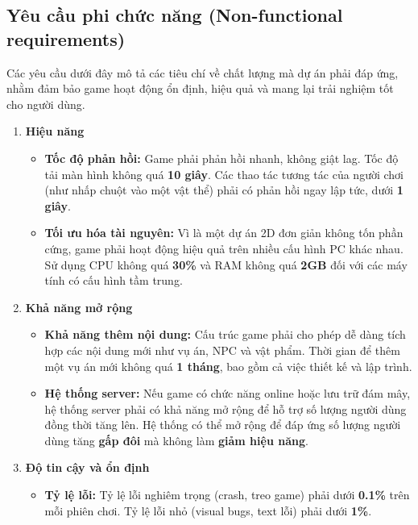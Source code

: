 \subsection{Yêu cầu phi chức năng (Non-functional requirements)}
Các yêu cầu dưới đây mô tả các tiêu chí về chất lượng mà dự án phải đáp ứng, nhằm đảm bảo game hoạt động ổn định, hiệu quả và mang lại trải nghiệm tốt cho người dùng.

\begin{enumerate}
    \item \textbf{Hiệu năng}
    \begin{itemize}
        \item \textbf{Tốc độ phản hồi:} 
        Game phải phản hồi nhanh, không giật lag. Tốc độ tải màn hình không quá \textbf{10 giây}. Các thao tác tương tác của người chơi (như nhấp chuột vào một vật thể) phải có phản hồi ngay lập tức, dưới \textbf{1 giây}.

        \item \textbf{Tối ưu hóa tài nguyên:}
        Vì là một dự án 2D đơn giản không tốn phần cứng, game phải hoạt động hiệu quả trên nhiều cấu hình PC khác nhau. Sử dụng CPU không quá \textbf{30\%} và RAM không quá \textbf{2GB} đối với các máy tính có cấu hình tầm trung.
    \end{itemize}

    \item \textbf{Khả năng mở rộng}
    \begin{itemize}
        \item \textbf{Khả năng thêm nội dung:}
        Cấu trúc game phải cho phép dễ dàng tích hợp các nội dung mới như vụ án, NPC và vật phẩm. Thời gian để thêm một vụ án mới không quá \textbf{1 tháng}, bao gồm cả việc thiết kế và lập trình.

        \item \textbf{Hệ thống server:}
        Nếu game có chức năng online hoặc lưu trữ đám mây, hệ thống server phải có khả năng mở rộng để hỗ trợ số lượng người dùng đồng thời tăng lên. Hệ thống có thể mở rộng để đáp ứng số lượng người dùng tăng \textbf{gấp đôi} mà không làm \textbf{giảm hiệu năng}.
    \end{itemize}

    \item \textbf{Độ tin cậy và ổn định}
    \begin{itemize}
        \item \textbf{Tỷ lệ lỗi:} Tỷ lệ lỗi nghiêm trọng (crash, treo game) phải dưới \textbf{0.1\%} trên mỗi phiên chơi. Tỷ lệ lỗi nhỏ (visual bugs, text lỗi) phải dưới \textbf{1\%}.


\end{itemize}
\end{enumerate}
